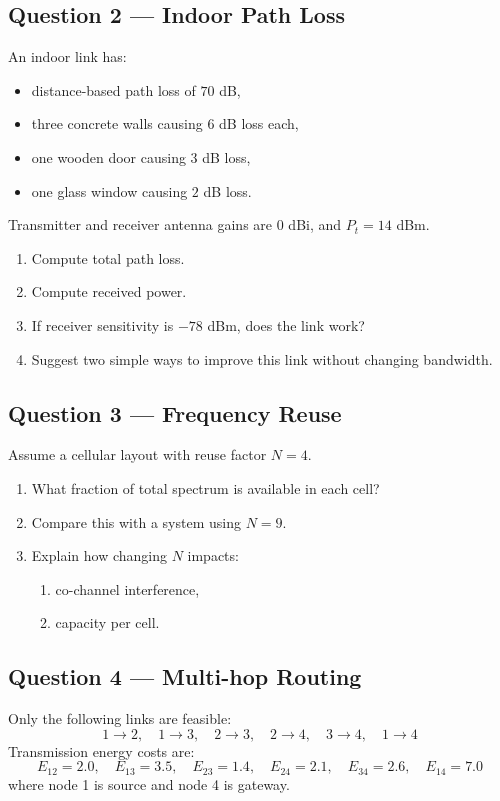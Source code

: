 \documentclass[11pt,a4paper]{article}
\begin{document}
\subsection*{Question 2 --- Indoor Path Loss}
An indoor link has:
\begin{itemize}[leftmargin=1.2cm]
    \item distance-based path loss of $70$ dB,
    \item three concrete walls causing $6$ dB loss each,
    \item one wooden door causing $3$ dB loss,
    \item one glass window causing $2$ dB loss.
    \end{itemize}

Transmitter and receiver antenna gains are $0$ dBi, and $P_t = 14$ dBm.

\begin{enumerate}[label=\alph*)]
    \item Compute total path loss.
    \item Compute received power.
    \item If receiver sensitivity is $-78$ dBm, does the link work?
    \item Suggest two simple ways to improve this link without changing bandwidth.
\end{enumerate}

\subsection*{Question 3 --- Frequency Reuse}
Assume a cellular layout with reuse factor $N=4$.

\begin{enumerate}[label=\alph*)]
    \item What fraction of total spectrum is available in each cell?
    \item Compare this with a system using $N=9$.
    \item Explain how changing $N$ impacts:
    \begin{enumerate}[label=\roman*)]
        \item co-channel interference,
        \item capacity per cell.
    \end{enumerate}
\end{enumerate}

\subsection*{Question 4 --- Multi-hop Routing}
Only the following links are feasible:
\[
1 \rightarrow 2,\quad 1 \rightarrow 3,\quad 2 \rightarrow 3,\quad 2 \rightarrow 4,\quad 3 \rightarrow 4,\quad 1 \rightarrow 4
\]
Transmission energy costs are:
\[
E_{12}=2.0,\quad E_{13}=3.5,\quad E_{23}=1.4,\quad E_{24}=2.1,\quad E_{34}=2.6,\quad E_{14}=7.0
\]
where node 1 is source and node 4 is gateway.
\end{document}
